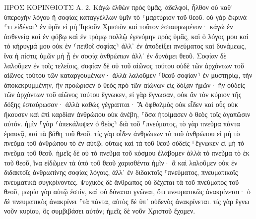\documentclass[twoside, 9pt]{extreport}
\begin{document}
ΠΡΟΣ ΚΟΡΙΝΘΙΟΥΣ Α.
2.
Κἀγὼ ἐλθὼν πρὸς ὑμᾶς, ἀδελφοί, ἦλθον οὐ καθ᾽ ὑπεροχὴν λόγου ἢ σοφίας καταγγέλλων ὑμῖν τὸ ⸀μαρτύριον τοῦ θεοῦ. 
οὐ γὰρ ἔκρινά ⸂τι εἰδέναι⸃ ἐν ὑμῖν εἰ μὴ Ἰησοῦν Χριστὸν καὶ τοῦτον ἐσταυρωμένον· 
κἀγὼ ἐν ἀσθενείᾳ καὶ ἐν φόβῳ καὶ ἐν τρόμῳ πολλῷ ἐγενόμην πρὸς ὑμᾶς, 
καὶ ὁ λόγος μου καὶ τὸ κήρυγμά μου οὐκ ἐν ⸂πειθοῖ σοφίας⸃ ἀλλ᾽ ἐν ἀποδείξει πνεύματος καὶ δυνάμεως, 
ἵνα ἡ πίστις ὑμῶν μὴ ᾖ ἐν σοφίᾳ ἀνθρώπων ἀλλ᾽ ἐν δυνάμει θεοῦ. 
Σοφίαν δὲ λαλοῦμεν ἐν τοῖς τελείοις, σοφίαν δὲ οὐ τοῦ αἰῶνος τούτου οὐδὲ τῶν ἀρχόντων τοῦ αἰῶνος τούτου τῶν καταργουμένων· 
ἀλλὰ λαλοῦμεν ⸂θεοῦ σοφίαν⸃ ἐν μυστηρίῳ, τὴν ἀποκεκρυμμένην, ἣν προώρισεν ὁ θεὸς πρὸ τῶν αἰώνων εἰς δόξαν ἡμῶν· 
ἣν οὐδεὶς τῶν ἀρχόντων τοῦ αἰῶνος τούτου ἔγνωκεν, εἰ γὰρ ἔγνωσαν, οὐκ ἂν τὸν κύριον τῆς δόξης ἐσταύρωσαν· 
ἀλλὰ καθὼς γέγραπται· Ἃ ὀφθαλμὸς οὐκ εἶδεν καὶ οὖς οὐκ ἤκουσεν καὶ ἐπὶ καρδίαν ἀνθρώπου οὐκ ἀνέβη, ⸀ὅσα ἡτοίμασεν ὁ θεὸς τοῖς ἀγαπῶσιν αὐτόν. 
ἡμῖν ⸀γὰρ ⸂ἀπεκάλυψεν ὁ θεὸς⸃ διὰ τοῦ ⸀πνεύματος, τὸ γὰρ πνεῦμα πάντα ἐραυνᾷ, καὶ τὰ βάθη τοῦ θεοῦ. 
τίς γὰρ οἶδεν ἀνθρώπων τὰ τοῦ ἀνθρώπου εἰ μὴ τὸ πνεῦμα τοῦ ἀνθρώπου τὸ ἐν αὐτῷ; οὕτως καὶ τὰ τοῦ θεοῦ οὐδεὶς ⸀ἔγνωκεν εἰ μὴ τὸ πνεῦμα τοῦ θεοῦ. 
ἡμεῖς δὲ οὐ τὸ πνεῦμα τοῦ κόσμου ἐλάβομεν ἀλλὰ τὸ πνεῦμα τὸ ἐκ τοῦ θεοῦ, ἵνα εἰδῶμεν τὰ ὑπὸ τοῦ θεοῦ χαρισθέντα ἡμῖν· 
ἃ καὶ λαλοῦμεν οὐκ ἐν διδακτοῖς ἀνθρωπίνης σοφίας λόγοις, ἀλλ᾽ ἐν διδακτοῖς ⸀πνεύματος, πνευματικοῖς πνευματικὰ συγκρίνοντες. 
Ψυχικὸς δὲ ἄνθρωπος οὐ δέχεται τὰ τοῦ πνεύματος τοῦ θεοῦ, μωρία γὰρ αὐτῷ ἐστίν, καὶ οὐ δύναται γνῶναι, ὅτι πνευματικῶς ἀνακρίνεται· 
ὁ δὲ πνευματικὸς ἀνακρίνει ⸀τὰ πάντα, αὐτὸς δὲ ὑπ᾽ οὐδενὸς ἀνακρίνεται. 
τίς γὰρ ἔγνω νοῦν κυρίου, ὃς συμβιβάσει αὐτόν; ἡμεῖς δὲ νοῦν Χριστοῦ ἔχομεν. 
\end{document}
